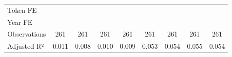 {\begin{tabular}{l*{8}{c}}
\midrule
Token FE            &                     &                     &                     &                     &                     &                     &                     &                     \\
Year FE             &                     &                     &                     &                     &                     &                     &                     &                     \\
Observations        &         261         &         261         &         261         &         261         &         261         &         261         &         261         &         261         \\
Adjusted R²         &       0.011         &       0.008         &       0.010         &       0.009         &       0.053         &       0.054         &       0.055         &       0.054         \\
\bottomrule
\end{tabular}
}
